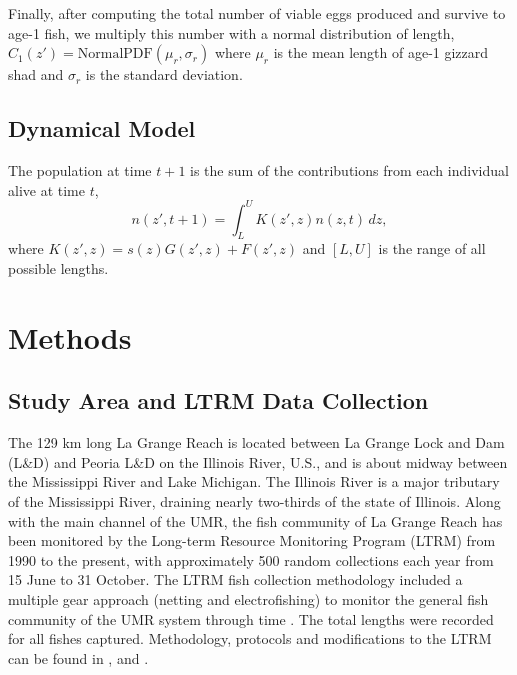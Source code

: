 \documentclass[preprint,review,12pt,authoryear]{elsarticle}
\def\ds{\displaystyle}
\begin{document}
Finally, after computing the total number of viable eggs produced and survive to age-1 fish, we multiply this number with a normal distribution of length,
$ \ds C_1 (z') =  \mathrm{Normal PDF} (\mu_r, \sigma_r)$ where $\mu_r$ is the mean length of age-1 gizzard shad and $\sigma_r$ is the standard deviation. 

\subsection{Dynamical Model} 
The population at time $t+1$ is the sum of the contributions from each individual alive at time $t$,
\begin{equation}\label{eq:IPM}
n(z',t+1) = \int_L^U K(z',z)n(z,t) \,dz,
\end{equation}  
where $K(z',z) = s(z) G(z',z) + F(z',z)$ and $[L,U]$ is the range of all possible lengths.

\section{Methods}
\subsection{Study Area and LTRM Data Collection}
The 129 km long La Grange Reach is located between La Grange Lock and Dam (L\&D) and Peoria L\&D on the Illinois River, U.S., 
and is about midway between the Mississippi River and Lake Michigan. The Illinois River is a major tributary of the Mississippi River, draining nearly two-thirds of the state of Illinois. Along with the main channel of the UMR, the fish community of La Grange Reach has been monitored by the Long-term Resource Monitoring Program (LTRM) from 1990 to the present, with approximately 500 random collections each year from 15 June to 31 October. The LTRM fish collection methodology included a multiple gear approach (netting and electrofishing) to monitor the general fish community of the UMR system through time \citep{gutreuter1995long}. The total lengths were recorded for all fishes captured. Methodology, protocols and modifications to the LTRM can be found in \cite{gutreuter1995long}, and \cite{ickes2002evaluation}. 
\end{document}
